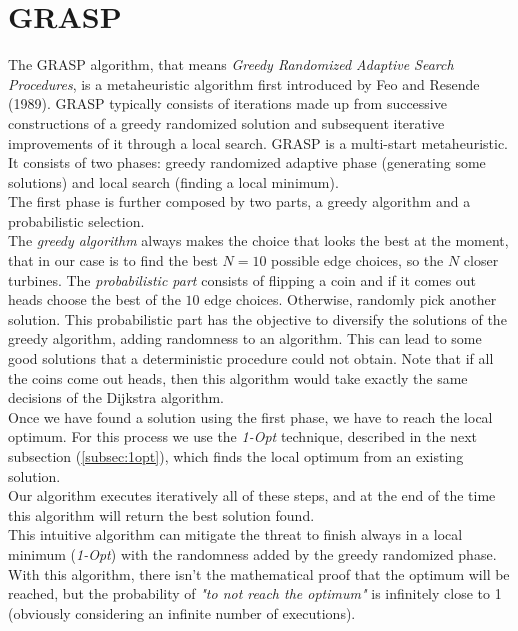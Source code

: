 \section{GRASP}
The GRASP algorithm, that means \textit{Greedy Randomized Adaptive Search Procedures}, is a metaheuristic algorithm first introduced by Feo and Resende (1989). GRASP typically consists of iterations made up from successive constructions of a greedy randomized solution and subsequent iterative improvements of it through a local search. GRASP is a multi-start metaheuristic. \\
It consists of two phases: greedy randomized adaptive phase (generating some solutions) and local search (finding a local minimum).\\
The first phase is further composed by two parts, a greedy algorithm and a probabilistic selection.\\
The \textit{greedy algorithm} always makes the choice that looks the best at the moment, that in our case is to find the best $N = 10$ possible edge choices, so the $N$ closer turbines. The \textit{probabilistic part} consists of flipping a coin and if it comes out heads choose the best of the $10$ edge choices. Otherwise, randomly pick another solution. This probabilistic part has the objective to diversify the solutions of the greedy algorithm, adding randomness to an algorithm. This can lead to some good solutions that a deterministic procedure could not obtain. Note that if all the coins come out heads, then this algorithm would take exactly the same decisions of the Dijkstra algorithm.\\
Once we have found a solution using the first phase, we have to reach the local optimum. For this process we use the \textit{1-Opt} technique, described in the next subsection (\ref{subsec:1opt}), which finds the local optimum from an existing solution.\\
Our algorithm executes iteratively all of these steps, and at the end of the time this algorithm will return the best solution found. \\
This intuitive algorithm can mitigate the threat to finish always in a local minimum (\textit{1-Opt}) with the randomness added by the greedy randomized phase.\\ 
With this algorithm, there isn't the mathematical proof that the optimum will be reached, but the probability of \textit{"to not reach the optimum"} is infinitely close to 1 (obviously considering an infinite number of executions). 
